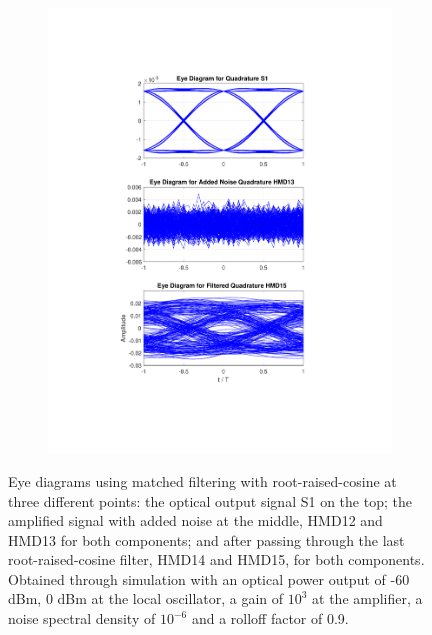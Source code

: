 \begin{figure}[H]
\begin{subfigure}{.45\textwidth}
		\includegraphics[clip, trim=5cm 4cm 5cm 4cm, width=\textwidth]{./sdf/m_qam_system/figures/eyes/q_n_p_60_09_rc.pdf}
	\end{subfigure}
	
	\caption{Eye diagrams using matched filtering with root-raised-cosine at three different points: the optical output signal S1 on the top; the amplified signal with added noise at the middle, HMD12 and HMD13 for both components; and after passing through the last root-raised-cosine filter, HMD14 and HMD15, for both components. Obtained through simulation with an optical power output of -60 dBm, 0 dBm at the local oscillator, a gain of $10^3$ at the amplifier, a noise spectral density of $10^{-6}$ and a rolloff factor of 0.9.\label{fig:eyes_n_rc_60_09}}
	
\end{figure}

